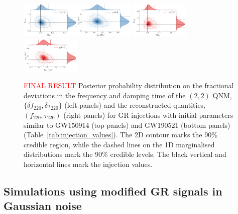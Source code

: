 \documentclass[twocolumn,prd,superscriptaddress,amsfonts,amssymb,amsmath,preprintnumbers]{revtex4-1}
\newcommand{\df}[1]{\delta f_{\text{#1}}}
\newcommand{\dtau}[1]{\delta \tau_{\text{#1}}}
\newcommand{\fngr}[1]{f_{\text{#1}}}
\newcommand{\taungr}[1]{\tau_{\text{#1}}}
\begin{document}
\begin{figure}[h!]
	\includegraphics[width=0.25\textwidth]{figures/GW150914_simulated_signal_0p0_deltaf220_deltatau220.png}\includegraphics[width=0.25\textwidth]{figures/GW150914_simulated_signal_0p0_f220_tau220.png}	
	\includegraphics[width=0.25\textwidth]{figures/GW190521_simulated_signal_0p0_deltaf220_deltatau220.png}\includegraphics[width=0.25\textwidth]{figures/GW190521_simulated_signal_0p0_f220_tau220.png}		
	\caption{\textcolor{red}{FINAL RESULT} Posterior probability distribution on the fractional deviations in the frequency and damping time of the $(2,2)$ QNM, $\{\df{220},\dtau{220}\}$ (left panels) and the reconstructed quantities, $(\fngr{220}, \taungr{220})$ (right panels) for GR injections with initial parameters similar to GW150914 (top panels) and GW190521 (bottom panels) (Table~\ref{tab:injection_values}). The 2D contour marks the 90\% credible region, while the dashed lines on the 1D marginalised distributions mark the 90\% credible levels. The black vertical and horizontal lines mark the injection values.}
	\label{fig:simulated_signal_GR}
\end{figure}

\subsection{Simulations using modified GR signals in Gaussian noise}
\end{document}

